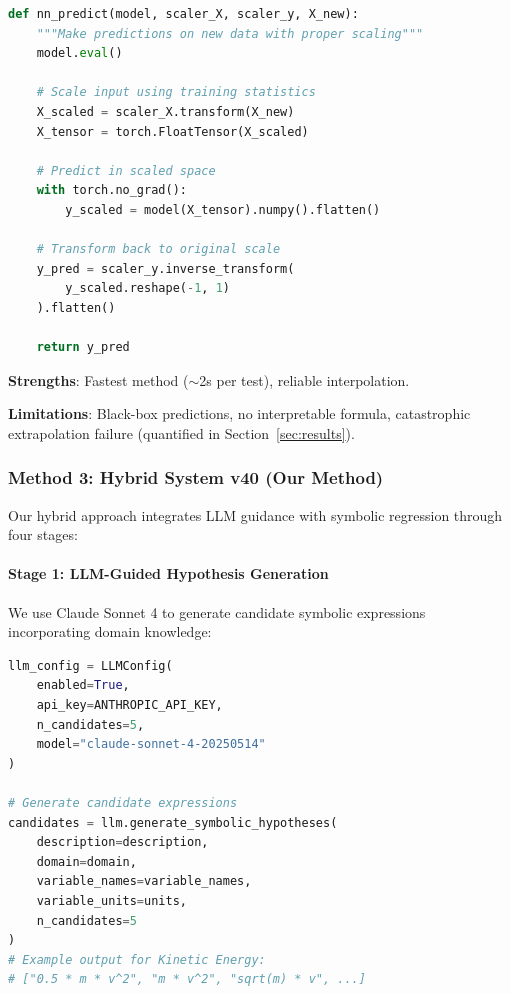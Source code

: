 \documentclass[twoside,11pt]{article}
\begin{document}
\begin{lstlisting}[language=Python, caption=Neural Network Prediction with Proper Scaling]
def nn_predict(model, scaler_X, scaler_y, X_new):
    """Make predictions on new data with proper scaling"""
    model.eval()
    
    # Scale input using training statistics
    X_scaled = scaler_X.transform(X_new)
    X_tensor = torch.FloatTensor(X_scaled)
    
    # Predict in scaled space
    with torch.no_grad():
        y_scaled = model(X_tensor).numpy().flatten()
    
    # Transform back to original scale
    y_pred = scaler_y.inverse_transform(
        y_scaled.reshape(-1, 1)
    ).flatten()
    
    return y_pred
\end{lstlisting}

\textbf{Strengths}: Fastest method ($\sim$2s per test), reliable interpolation.

\textbf{Limitations}: Black-box predictions, no interpretable formula, catastrophic extrapolation failure (quantified in Section~\ref{sec:results}).


\subsubsection{Method 3: Hybrid System v40 (Our Method)}

Our hybrid approach integrates LLM guidance with symbolic regression through four stages:

\paragraph{Stage 1: LLM-Guided Hypothesis Generation}

We use Claude Sonnet 4 to generate candidate symbolic expressions incorporating domain knowledge:

\begin{lstlisting}[language=Python, caption=LLM Hypothesis Generation]
llm_config = LLMConfig(
    enabled=True,
    api_key=ANTHROPIC_API_KEY,
    n_candidates=5,
    model="claude-sonnet-4-20250514"
)

# Generate candidate expressions
candidates = llm.generate_symbolic_hypotheses(
    description=description,
    domain=domain,
    variable_names=variable_names,
    variable_units=units,
    n_candidates=5
)
# Example output for Kinetic Energy:
# ["0.5 * m * v^2", "m * v^2", "sqrt(m) * v", ...]
\end{lstlisting}
\end{document}
